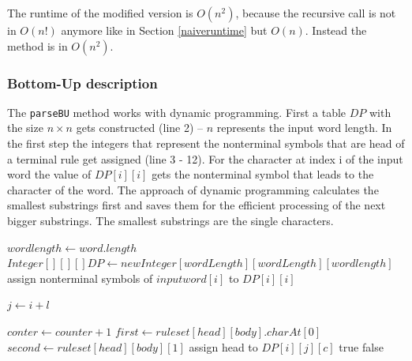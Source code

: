 \documentclass[a4paper, 11pt]{article}
\begin{document}
The runtime of the modified version is $O(n^2)$, because the recursive call is not in $O(n!)$ anymore like in Section \ref{naiveruntime} but $O(n)$. Instead the method is in $O(n^2)$.




\subsubsection{Bottom-Up description}
\label{bottomupdescription}

The \texttt{parseBU} method works with dynamic programming.
First a table $DP$ with the size $n \times n$ gets constructed (line 2) -- $n$ represents the input word length.
In the first step the integers that represent the nonterminal symbols that are head of a terminal rule get assigned (line 3 - 12). For the character at index i of the input word the value of $DP[i][i]$ gets the nonterminal symbol that leads to the character of the word.
The approach of dynamic programming calculates the smallest substrings first and saves them for the efficient processing of the next bigger substrings.  The smallest substrings are the single characters.


\begin{center}
\label{alg:cap}
\begin{algorithmic}[1]
\State $wordlength \gets word.length$ 
\State $Integer[][][] DP \gets new Integer[wordLength][wordLength][wordlength]$
\State assign nonterminal symbols of $inputword[i]$ to $DP[i][i]$
\EndIf
\EndFor

\State $j \gets i + l$

\State $conter \gets counter + 1$
\State $first \gets ruleset[head][body].charAt[0]$
\State $second \gets ruleset[head][body][1]$
\State assign head to $DP[i][j][c]$\footnotemark
\EndIf
\EndIf
\EndFor
\EndFor
\EndFor
\EndFor
\EndFor
{}
\State \Return true
\EndIf
\State \Return false
\end{algorithmic}
\hrulefill
\end{center}
\end{document}
